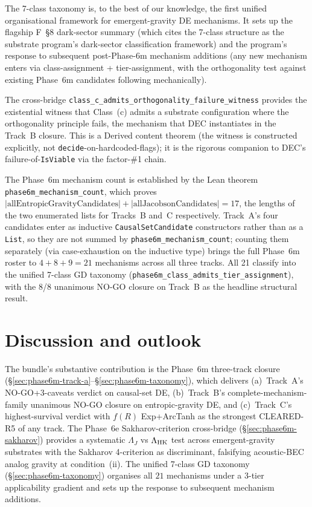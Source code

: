 \documentclass[aps,prd,reprint,nofootinbib,superscriptaddress]{revtex4-2}
\begin{document}
The 7-class taxonomy is, to the best of our knowledge, the first
unified organisational framework for emergent-gravity DE mechanisms.
It sets up the
flagship F~§8 dark-sector summary (which cites the 7-class structure as
the substrate program's dark-sector classification framework) and the
program's response to subsequent post-Phase-6m mechanism additions
(any new mechanism enters via class-assignment + tier-assignment, with
the orthogonality test against existing Phase~6m candidates following
mechanically).

The cross-bridge \texttt{class\_c\_admits\_orthogonality\_failure\_witness}
provides the existential witness that Class~(c) admits a substrate
configuration where the orthogonality principle fails, the mechanism
that DEC instantiates in the Track~B closure. This is a Derived
content theorem (the witness is constructed explicitly, not
\texttt{decide}-on-hardcoded-flags); it is the rigorous companion to
DEC's failure-of-\texttt{IsViable} via the factor-\#1 chain.

The Phase~6m mechanism count is established by the Lean theorem
\texttt{phase6m\_mechanism\_count}, which proves
$|\text{allEntropicGravityCandidates}| + |\text{allJacobsonCandidates}| =
17$, the lengths of the two enumerated lists for Tracks~B and~C
respectively. Track~A's four candidates enter as inductive
\texttt{CausalSetCandidate} constructors rather than as a
\texttt{List}, so they are not summed by \texttt{phase6m\_mechanism\_count};
counting them separately (via case-exhaustion on the inductive type)
brings the full Phase~6m roster to $4 + 8 + 9 = 21$ mechanisms across
all three tracks. All 21 classify into the unified 7-class GD
taxonomy (\texttt{phase6m\_class\_admits\_tier\_assignment}), with the
8/8 unanimous NO-GO closure on Track~B as the headline structural
result.


\section{Discussion and outlook}
\label{sec:discussion}

The bundle's substantive contribution is the Phase~6m three-track
closure (§\ref{sec:phase6m-track-a}--\S\ref{sec:phase6m-taxonomy}),
which delivers (a)~Track~A's NO-GO+3-caveats verdict on causal-set DE,
(b)~Track~B's complete-mechanism-family unanimous NO-GO closure on
entropic-gravity DE, and (c)~Track~C's highest-survival verdict with
$f(R)$ Exp+ArcTanh as the strongest CLEARED-R5 of any track. The
Phase~6e Sakharov-criterion cross-bridge (§\ref{sec:phase6m-sakharov})
provides a systematic $\Lambda_J$ vs $\Lambda_{\rm HK}$ test across
emergent-gravity substrates with the Sakharov 4-criterion as
discriminant, falsifying acoustic-BEC analog gravity at condition~(ii). The unified 7-class GD taxonomy
(§\ref{sec:phase6m-taxonomy}) organises all $21$ mechanisms under a
3-tier applicability gradient and sets up the response to subsequent
mechanism additions.
\end{document}
